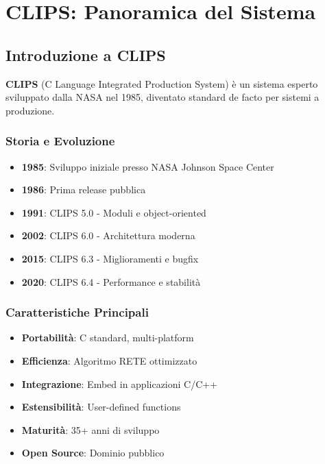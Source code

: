 
\chapter{CLIPS: Panoramica del Sistema}
\label{cap:clips_overview}

\section{Introduzione a CLIPS}

\textbf{CLIPS} (C Language Integrated Production System) è un sistema esperto sviluppato dalla NASA nel 1985, diventato standard de facto per sistemi a produzione.

\subsection{Storia e Evoluzione}

\begin{itemize}
\item \textbf{1985}: Sviluppo iniziale presso NASA Johnson Space Center
\item \textbf{1986}: Prima release pubblica
\item \textbf{1991}: CLIPS 5.0 - Moduli e object-oriented
\item \textbf{2002}: CLIPS 6.0 - Architettura moderna
\item \textbf{2015}: CLIPS 6.3 - Miglioramenti e bugfix
\item \textbf{2020}: CLIPS 6.4 - Performance e stabilità
\end{itemize}

\subsection{Caratteristiche Principali}

\begin{infobox}
\begin{itemize}
\item \textbf{Portabilità}: C standard, multi-platform
\item \textbf{Efficienza}: Algoritmo RETE ottimizzato
\item \textbf{Integrazione}: Embed in applicazioni C/C++
\item \textbf{Estensibilità}: User-defined functions
\item \textbf{Maturità}: 35+ anni di sviluppo
\item \textbf{Open Source}: Dominio pubblico
\end{itemize}
\end{infobox}

